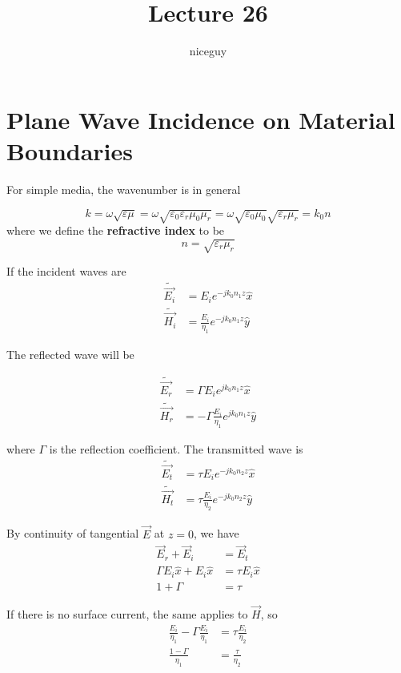\documentclass[12pt]{article}
\title{Lecture 26}
\author{niceguy}
\begin{document}
\maketitle

\section{Plane Wave Incidence on Material Boundaries}

For simple media, the wavenumber is in general

$$k = \omega\sqrt{\varepsilon\mu} = \omega\sqrt{\varepsilon_0\varepsilon_r\mu_0\mu_r} = \omega\sqrt{\varepsilon_0\mu_0}\sqrt{\varepsilon_r\mu_r} = k_0n$$
where we define the \textbf{refractive index} to be
$$n = \sqrt{\varepsilon_r\mu_r}$$

If the incident waves are
\begin{align*}
    \tilde{\vec{E_i}} &= E_ie^{-jk_0n_1z} \hat x \\
    \tilde{\vec{H_i}} &= \frac{E_i}{\eta_1} e^{-jk_0n_1z} \hat y
\end{align*}

The reflected wave will be

\begin{align*}
    \tilde{\vec{E_r}} &= \Gamma E_i e^{jk_0n_1z} \hat x \\
    \tilde{\vec{H_r}} &= -\Gamma \frac{E_i}{\eta_1} e^{jk_0n_1z} \hat y
\end{align*}

where $\Gamma$ is the reflection coefficient. The transmitted wave is
\begin{align*}
    \tilde{\vec{E_t}} &= \tau E_i e^{-jk_0n_2z} \hat x \\
    \tilde{\vec{H_t}} &= \tau \frac{E_i}{\eta_2} e^{-jk_0n_2z} \hat y
\end{align*}

By continuity of tangential $\vec E$ at $z = 0$, we have
\begin{align*}
    \vec E_r + \vec E_i &= \vec E_t \\
    \Gamma E_i \hat x + E_i \hat x &= \tau E_i \hat x \\
    1 + \Gamma &= \tau
\end{align*}

If there is no surface current, the same applies to $\vec H$, so
\begin{align*}
    \frac{E_i}{\eta_1} - \Gamma \frac{E_i}{\eta_1} &= \tau \frac{E_i}{\eta_2} \\
    \frac{1 - \Gamma}{\eta_1} &= \frac{\tau}{\eta_2}
\end{align*}
\end{document}
